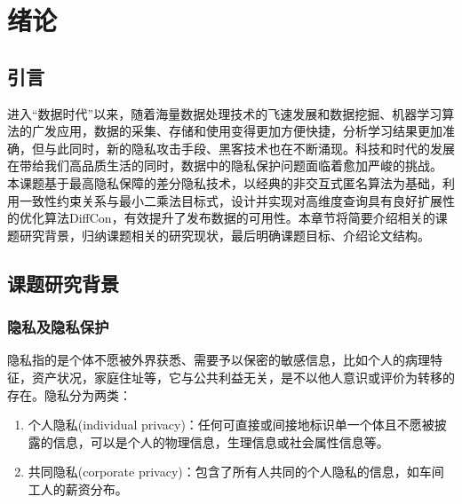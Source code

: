 
\chapter{绪论}
\label{chap:introduction}

\section{引言}
\label{sec:objective}
进入“数据时代”以来，随着海量数据处理技术的飞速发展和数据挖掘、机器学习算法的广发应用，数据的采集、存储和使用变得更加方便快捷，分析学习结果更加准确，但与此同时，新的隐私攻击手段、黑客技术也在不断涌现。科技和时代的发展在带给我们高品质生活的同时，数据中的隐私保护问题面临着愈加严峻的挑战。
本课题基于最高隐私保障的差分隐私技术，以经典的非交互式匿名算法为基础，利用一致性约束关系与最小二乘法目标式，设计并实现对高维度查询具有良好扩展性的优化算法DiffCon，有效提升了发布数据的可用性。本章节将简要介绍相关的课题研究背景，归纳课题相关的研究现状，最后明确课题目标、介绍论文结构。


\section{课题研究背景}

\subsection{隐私及隐私保护}  %

隐私指的是个体不愿被外界获悉、需要予以保密的敏感信息，比如个人的病理特征，资产状况，家庭住址等，它与公共利益无关，是不以他人意识或评价为转移的存在。隐私分为两类\supercite{Defining-Privacy-for-Data}：
\begin{enumerate}
	\item 个人隐私(individual privacy)：任何可直接或间接地标识单一个体且不愿被披露的信息，可以是个人的物理信息，生理信息或社会属性信息等。
	\item 共同隐私(corporate privacy)：包含了所有人共同的个人隐私的信息，如车间工人的薪资分布。
\end{enumerate}

